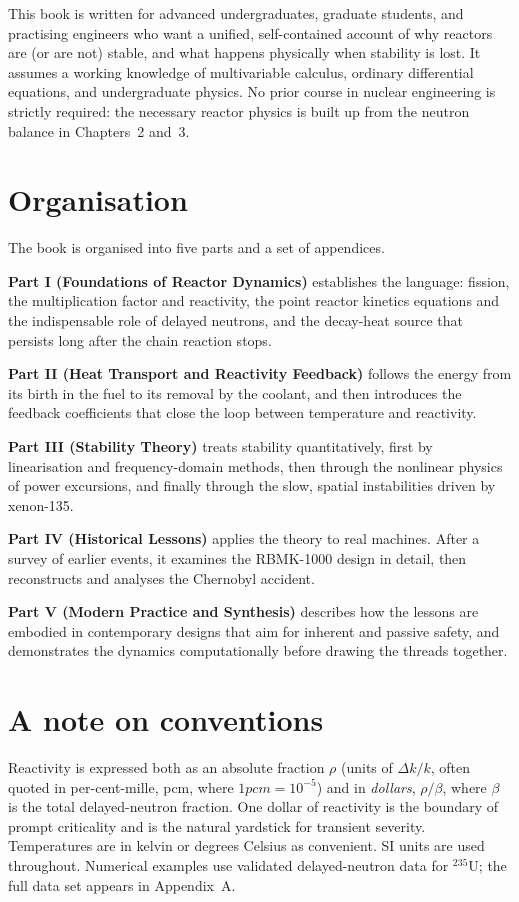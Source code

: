 This book is written for advanced undergraduates, graduate students, and
practising engineers who want a unified, self-contained account of why reactors
are (or are not) stable, and what happens physically when stability is lost. It
assumes a working knowledge of multivariable calculus, ordinary differential
equations, and undergraduate physics. No prior course in nuclear engineering is
strictly required: the necessary reactor physics is built up from the neutron
balance in Chapters~2 and~3.

\section*{Organisation}

The book is organised into five parts and a set of appendices.

\textbf{Part I (Foundations of Reactor Dynamics)} establishes the language:
fission, the multiplication factor and reactivity, the point reactor kinetics
equations and the indispensable role of delayed neutrons, and the decay-heat
source that persists long after the chain reaction stops.

\textbf{Part II (Heat Transport and Reactivity Feedback)} follows the energy from
its birth in the fuel to its removal by the coolant, and then introduces the
feedback coefficients that close the loop between temperature and reactivity.

\textbf{Part III (Stability Theory)} treats stability quantitatively, first by
linearisation and frequency-domain methods, then through the nonlinear physics
of power excursions, and finally through the slow, spatial instabilities driven
by xenon-135.

\textbf{Part IV (Historical Lessons)} applies the theory to real machines. After
a survey of earlier events, it examines the RBMK-1000 design in detail, then
reconstructs and analyses the Chernobyl accident.

\textbf{Part V (Modern Practice and Synthesis)} describes how the lessons are
embodied in contemporary designs that aim for inherent and passive safety, and
demonstrates the dynamics computationally before drawing the threads together.

\section*{A note on conventions}

Reactivity is expressed both as an absolute fraction $\rho$ (units of $\Delta
k/k$, often quoted in per-cent-mille, pcm, where $1\unit{pcm}=10^{-5}$) and in
\emph{dollars}, $\rho/\beta$, where $\beta$ is the total delayed-neutron
fraction. One dollar of reactivity is the boundary of prompt criticality and is
the natural yardstick for transient severity. Temperatures are in kelvin or
degrees Celsius as convenient. SI units are used throughout. Numerical examples
use validated delayed-neutron data for $^{235}$U; the full data set appears in
Appendix~A.

